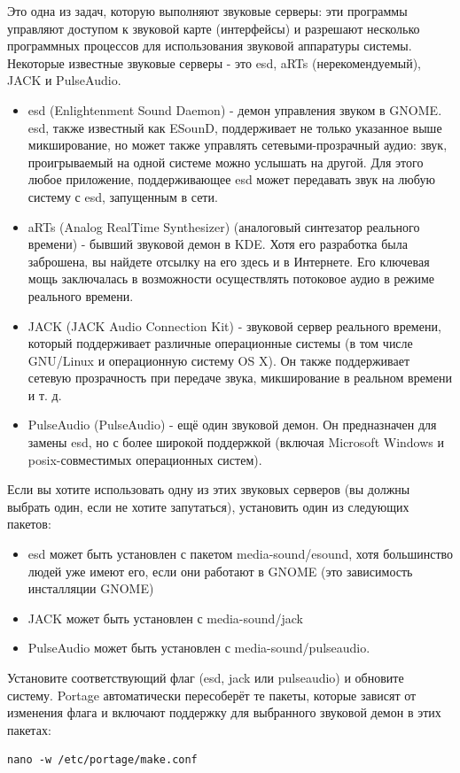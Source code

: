 \documentclass[10pt]{book}
\begin{document}
Это одна из задач, которую выполняют звуковые серверы: эти программы управляют доступом к звуковой карте (интерфейсы) и разрешают несколько программных процессов для использования звуковой аппаратуры системы. Некоторые известные звуковые серверы - это  esd, aRTs (нерекомендуемый),  JACK и PulseAudio.

\begin{itemize}
\item esd (Enlightenment Sound Daemon) - демон управления звуком в GNOME. esd, также известный как ESounD, поддерживает не только указанное выше микширование, но может также управлять сетевыми-прозрачный аудио: звук, проигрываемый на одной системе можно услышать на другой. Для этого любое приложение, поддерживающее esd может передавать звук на любую систему с esd, запущенным в сети.
\item aRTs (Analog RealTime Synthesizer) (аналоговый синтезатор реального времени) - бывший звуковой демон в KDE. Хотя его разработка была заброшена, вы найдете отсылку на его здесь и  в Интернете. Его ключевая мощь заключалась в возможности осуществлять потоковое аудио в режиме реального времени.
\item JACK (JACK Audio Connection Kit) - звуковой сервер реального времени, который поддерживает различные операционные системы (в том числе GNU/Linux и операционную систему OS X). Он также поддерживает сетевую прозрачность при передаче звука, микширование в реальном времени и т. д.
\item PulseAudio (PulseAudio) - ещё один звуковой демон. Он предназначен для замены esd, но с более широкой поддержкой (включая Microsoft Windows и posix-совместимых операционных систем).
\end{itemize}

Если вы хотите использовать одну из этих звуковых серверов (вы должны выбрать один, если не хотите запутаться), установить один из следующих пакетов:

\begin{itemize} 
\item esd может быть установлен с пакетом media-sound/esound, хотя большинство людей уже имеют его, если они работают в GNOME (это зависимость инсталляции GNOME)
\item JACK может быть установлен с  media-sound/jack
\item PulseAudio может быть установлен с media-sound/pulseaudio.
\end{itemize}

Установите соответствующий флаг (esd, jack или pulseaudio) и обновите систему. Portage автоматически пересоберёт те пакеты, которые зависят от изменения флага и включают поддержку для выбранного звуковой демон в этих пакетах:
\begin{tcolorbox}
\begin{lstlisting}
nano -w /etc/portage/make.conf
\end{lstlisting}
\end{tcolorbox}
\end{document}
